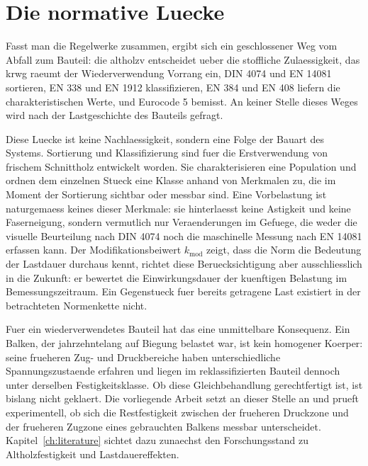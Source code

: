 \section{Die normative Luecke}
\label{sec:luecke}

Fasst man die Regelwerke zusammen, ergibt sich ein geschlossener Weg vom
Abfall zum Bauteil: die \acrshort{altholzv} entscheidet ueber die stoffliche
Zulaessigkeit, das \acrshort{krwg} raeumt der Wiederverwendung Vorrang ein,
DIN 4074 und EN 14081 sortieren, EN 338 und EN 1912 klassifizieren, EN 384 und
EN 408 liefern die charakteristischen Werte, und Eurocode 5 bemisst. An keiner
Stelle dieses Weges wird nach der Lastgeschichte des Bauteils gefragt.

Diese Luecke ist keine Nachlaessigkeit, sondern eine Folge der Bauart des
Systems. Sortierung und Klassifizierung sind fuer die Erstverwendung von
frischem Schnittholz entwickelt worden. Sie charakterisieren eine Population
und ordnen dem einzelnen Stueck eine Klasse anhand von Merkmalen zu, die im
Moment der Sortierung sichtbar oder messbar sind. Eine Vorbelastung ist
naturgemaess keines dieser Merkmale: sie hinterlaesst keine Astigkeit und
keine Faserneigung, sondern vermutlich nur Veraenderungen im Gefuege, die
weder die visuelle Beurteilung nach DIN 4074 noch die maschinelle Messung nach
EN 14081 erfassen kann. Der Modifikationsbeiwert $k_{\mathrm{mod}}$ zeigt, dass
die Norm die Bedeutung der Lastdauer durchaus kennt, richtet diese
Beruecksichtigung aber ausschliesslich in die Zukunft: er bewertet die
Einwirkungsdauer der kuenftigen Belastung im Bemessungszeitraum. Ein
Gegenstueck fuer bereits getragene Last existiert in der betrachteten
Normenkette nicht.

Fuer ein wiederverwendetes Bauteil hat das eine unmittelbare Konsequenz. Ein
Balken, der jahrzehntelang auf Biegung belastet war, ist kein homogener
Koerper: seine frueheren Zug- und Druckbereiche haben unterschiedliche
Spannungszustaende erfahren und liegen im reklassifizierten Bauteil dennoch
unter derselben Festigkeitsklasse. Ob diese Gleichbehandlung gerechtfertigt
ist, ist bislang nicht geklaert. Die vorliegende Arbeit setzt an dieser Stelle
an und prueft experimentell, ob sich die Restfestigkeit zwischen der
frueheren Druckzone und der frueheren Zugzone eines gebrauchten Balkens
messbar unterscheidet. Kapitel~\ref{ch:literature} sichtet dazu zunaechst den
Forschungsstand zu Altholzfestigkeit und Lastdauereffekten.

